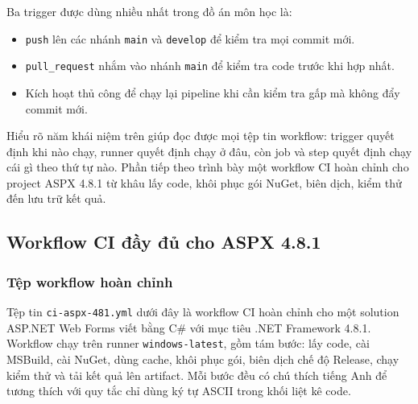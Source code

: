 Ba trigger được dùng nhiều nhất trong đồ án môn học là:
\begin{itemize}
\item \verb|push| lên các nhánh \verb|main| và \verb|develop| để kiểm tra mọi commit mới.
\item \verb|pull_request| nhắm vào nhánh \verb|main| để kiểm tra code trước khi hợp nhất.
\item Kích hoạt thủ công để chạy lại pipeline khi cần kiểm tra gấp mà không đẩy commit mới.
\end{itemize}

Hiểu rõ năm khái niệm trên giúp đọc được mọi tệp tin workflow: trigger quyết định khi nào chạy,
runner quyết định chạy ở đâu, còn job và step quyết định chạy cái gì theo thứ tự nào.
Phần tiếp theo trình bày một workflow CI hoàn chỉnh cho project ASPX 4.8.1 từ khâu
lấy code, khôi phục gói NuGet, biên dịch, kiểm thử đến lưu trữ kết quả.

\subsection{Workflow CI đầy đủ cho ASPX 4.8.1}

\subsubsection{Tệp workflow hoàn chỉnh}

Tệp tin \verb|ci-aspx-481.yml| dưới đây là workflow CI hoàn chỉnh cho một solution ASP.NET Web Forms
viết bằng C\# với mục tiêu .NET Framework 4.8.1. Workflow chạy trên runner \verb|windows-latest|,
gồm tám bước: lấy code, cài MSBuild, cài NuGet, dùng cache, khôi phục gói,
biên dịch chế độ Release, chạy kiểm thử và tải kết quả lên artifact.
Mỗi bước đều có chú thích tiếng Anh để tương thích với quy tắc chỉ dùng ký tự ASCII trong khối liệt kê code.

